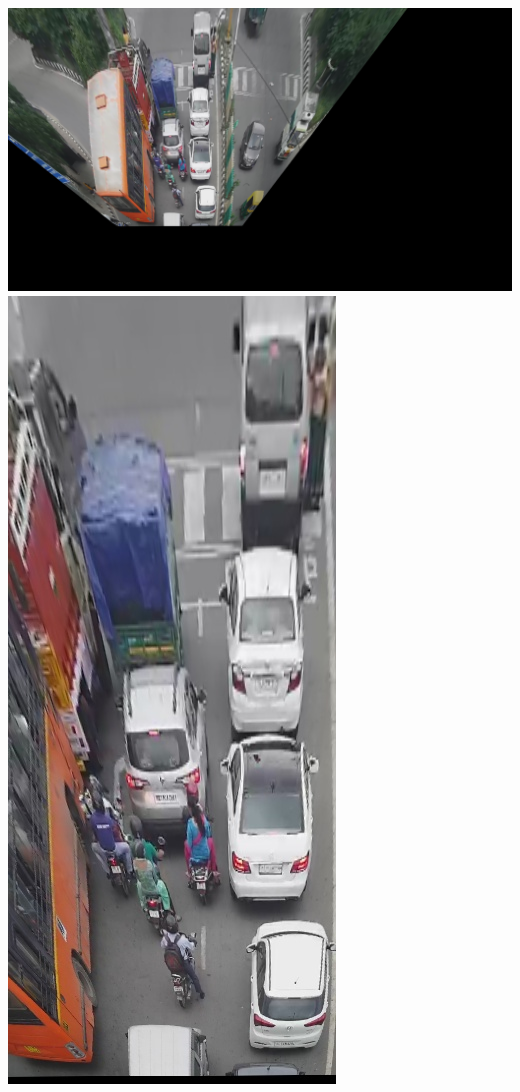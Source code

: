\documentclass{article} %
\begin{document}
\\\includegraphics[scale = 0.19]{out_images/projected_out_traffic.jpg}
\includegraphics[scale = 0.26]{out_images/cropped_out_traffic.jpg}
\end{document}
